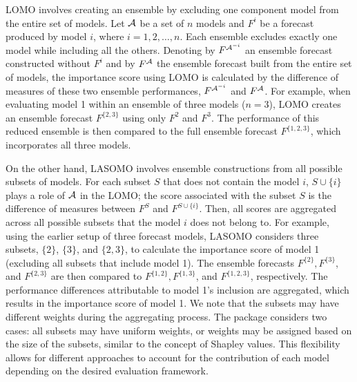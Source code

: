\documentclass[
  article,
  shortnames,
  notitle]{jss}
\begin{document}
LOMO involves creating an ensemble by excluding one component model from
the entire set of models. Let \({\cal A}\) be a set of \(n\) models and
\(F^i\) be a forecast produced by model \(i\), where
\(i = 1,2, \dots, n.\) Each ensemble excludes exactly one model while
including all the others. Denoting by \(F^{{\cal A}^{-i}}\) an ensemble
forecast constructed without \(F^i\) and by \(F^{\cal A}\) the ensemble
forecast built from the entire set of models, the importance score using
LOMO is calculated by the difference of measures of these two ensemble
performances, \(F^{{\cal A}^{-i}}\) and \(F^{\cal A}\). For example,
when evaluating model 1 within an ensemble of three models (\(n=3\)),
LOMO creates an ensemble forecast \(F^{\{2,3\}}\) using only \(F^2\) and
\(F^3\). The performance of this reduced ensemble is then compared to
the full ensemble forecast \(F^{\{1,2,3\}}\), which incorporates all
three models.

On the other hand, LASOMO involves ensemble constructions from all
possible subsets of models. For each subset \(S\) that does not contain
the model \(i\), \(S \cup \{i\}\) plays a role of \({\cal A}\) in the
LOMO; the score associated with the subset \(S\) is the difference of
measures between \(F^S\) and \(F^{S \cup \{i\}}\). Then, all scores are
aggregated across all possible subsets that the model \(i\) does not
belong to. For example, using the earlier setup of three forecast
models, LASOMO considers three subsets, \(\{2\}\), \(\{3\}\), and
\(\{2, 3\}\), to calculate the importance score of model 1 (excluding
all subsets that include model 1). The ensemble forecasts
\(F^{\{2\}}, F^{\{3\}}\), and \(F^{\{2,3\}}\) are then compared to
\(F^{\{1,2\}}, F^{\{1,3\}}\), and \(F^{\{1,2,3\}}\), respectively. The
performance differences attributable to model 1's inclusion are
aggregated, which results in the importance score of model 1. We note
that the subsets may have different weights during the aggregating
process. The  package considers two cases: all
subsets may have uniform weights, or weights may be assigned based on
the size of the subsets, similar to the concept of Shapley values. This
flexibility allows for different approaches to account for the
contribution of each model depending on the desired evaluation
framework.
\end{document}
